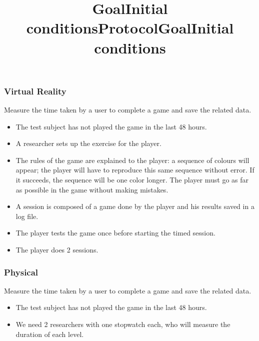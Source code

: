 \documentclass[12pt, openany, twocolumn]{article}
\begin{document}
        \subsubsection{Virtual Reality}
            \title{\textbf{Goal}} \vspace{0.25cm}

            \noindent Measure the time taken by a user to complete a game and save the related data.
            \\

            \noindent \title{\textbf{Initial conditions}}
                \begin{itemize}
                \renewcommand\labelitemi{--}
                    \item{The test subject has not played the game in the last 48 hours.}
                    \item{A researcher sets up the exercise for the player.}
                \end{itemize}

            \noindent \title{\textbf{Protocol}}
                \begin{itemize}
                \renewcommand\labelitemi{--}
                    \item{The rules of the game are explained to the player: a sequence of colours will appear; the player will have to reproduce this same sequence without error. If it succeeds, the sequence will be one color longer. The player must go as far as possible in the game without making mistakes.}
                    \item{A session is composed of a game done by the player and his results saved in a log file.}
                    \item{The player tests the game once before starting the timed session.}
                    \item{The player does 2 sessions.}
                \end{itemize}

        \subsubsection{Physical}
            \title{\textbf{Goal}} \vspace{0.25cm}

            \noindent Measure the time taken by a user to complete a game and save the related data.
            \\

            \noindent \title{\textbf{Initial conditions}}
                \begin{itemize}
                \renewcommand\labelitemi{--}
                    \item{The test subject has not played the game in the last 48 hours.}
                    \item{We need 2 researchers with one stopwatch each, who will measure the duration of each level.}
                \end{itemize}
            
\end{document}
